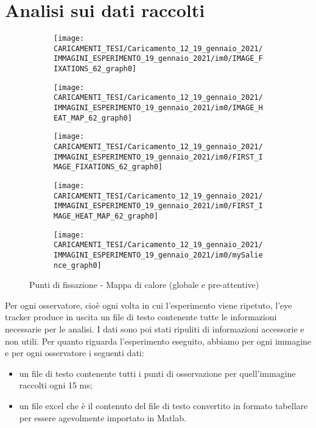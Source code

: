 \documentclass[%
	corpo=12pt,
    twoside,
    stile=classica,
    oldstyle,
    tipotesi=custom,
    greek,
    evenboxes,
]{toptesi}
\begin{document}
{\section{Analisi sui dati raccolti}
\begin{figure}[!htb]\centering
\begin{subfigure}
\centering
\texttt{[image: CARICAMENTI\_TESI/Caricamento\_12\_19\_gennaio\_2021/IMMAGINI\_ESPERIMENTO\_19\_gennaio\_2021/im0/IMAGE\_FIXATIONS\_62\_graph0]}
\end{subfigure}
\begin{subfigure}
\centering
\texttt{[image: CARICAMENTI\_TESI/Caricamento\_12\_19\_gennaio\_2021/IMMAGINI\_ESPERIMENTO\_19\_gennaio\_2021/im0/IMAGE\_HEAT\_MAP\_62\_graph0]}
\end{subfigure}
\begin{subfigure}
\centering
\texttt{[image: CARICAMENTI\_TESI/Caricamento\_12\_19\_gennaio\_2021/IMMAGINI\_ESPERIMENTO\_19\_gennaio\_2021/im0/FIRST\_IMAGE\_FIXATIONS\_62\_graph0]}
\end{subfigure}
\begin{subfigure}
\centering
\texttt{[image: CARICAMENTI\_TESI/Caricamento\_12\_19\_gennaio\_2021/IMMAGINI\_ESPERIMENTO\_19\_gennaio\_2021/im0/FIRST\_IMAGE\_HEAT\_MAP\_62\_graph0]}
\end{subfigure}
\begin{subfigure}
\centering
\texttt{[image: CARICAMENTI\_TESI/Caricamento\_12\_19\_gennaio\_2021/IMMAGINI\_ESPERIMENTO\_19\_gennaio\_2021/im0/mySalience\_graph0]}
\end{subfigure}
\caption{Punti di fissazione - Mappa di calore (globale e pre-attentive)}\label{fig: IMAGE_FIXATIONS_62_graph0}
\end{figure}

Per ogni osservatore, cioè ogni volta in cui l'esperimento viene ripetuto, l'eye tracker produce in uscita un file di testo contenente tutte le informazioni necessarie per le analisi. I dati sono poi stati ripuliti di informazioni accessorie e non utili. 
Per quanto riguarda l'esperimento eseguito, abbiamo per ogni immagine e per ogni osservatore i seguenti dati:
\begin{itemize}
\item  un file di testo contenente tutti i punti di osservazione per quell'immagine raccolti ogni 15 ms;
\item un file excel che è il contenuto del file di testo convertito in formato tabellare per essere agevolmente importato in Matlab.
\end{itemize}

}
\end{document}
